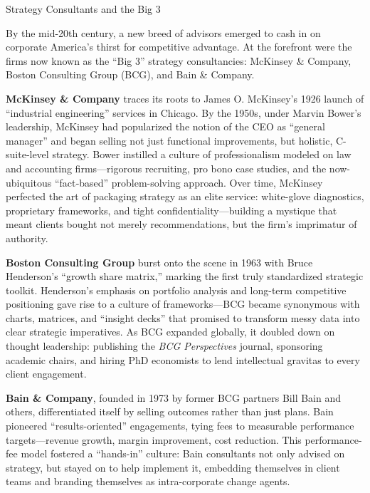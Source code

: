 \begin{HistoricalSidebar}{Strategy Consultants and the Big 3}

  By the mid-20th century, a new breed of advisors emerged to cash in on corporate America’s thirst for competitive 
  advantage.  At the forefront were the firms now known as the “Big 3” strategy consultancies: McKinsey \& Company, 
  Boston Consulting Group (BCG), and Bain \& Company.  

  \medskip
  
  \textbf{McKinsey \& Company} traces its roots to James O. McKinsey’s 1926 launch of “industrial engineering” services 
  in Chicago.  By the 1950s, under Marvin Bower’s leadership, McKinsey had popularized the notion of the CEO as 
  “general manager” and began selling not just functional improvements, but holistic, C-suite‐level strategy.  
  Bower instilled a culture of professionalism modeled on law and accounting firms—rigorous recruiting, 
  pro bono case studies, and the now-ubiquitous “fact‐based” problem-solving approach.  Over time, McKinsey 
  perfected the art of packaging strategy as an elite service: white-glove diagnostics, proprietary frameworks, 
  and tight confidentiality—building a mystique that meant clients bought not merely recommendations, but the 
  firm’s imprimatur of authority.

  \medskip
  
  \textbf{Boston Consulting Group} burst onto the scene in 1963 with Bruce Henderson’s “growth share matrix,” marking 
  the first truly standardized strategic toolkit.  Henderson’s emphasis on portfolio analysis and long-term competitive 
  positioning gave rise to a culture of frameworks—BCG became synonymous with charts, matrices, and “insight decks” 
  that promised to transform messy data into clear strategic imperatives.  As BCG expanded globally, it doubled down 
  on thought leadership: publishing the \emph{BCG Perspectives} journal, sponsoring academic chairs, and hiring 
  PhD economists to lend intellectual gravitas to every client engagement.

  \medskip
  
  \textbf{Bain \& Company}, founded in 1973 by former BCG partners Bill Bain and others, differentiated itself by selling 
  outcomes rather than just plans.  Bain pioneered “results-oriented” engagements, tying fees to measurable performance 
  targets—revenue growth, margin improvement, cost reduction.  This performance-fee model fostered a “hands-in” culture: 
  Bain consultants not only advised on strategy, but stayed on to help implement it, embedding themselves in client 
  teams and branding themselves as intra-corporate change agents.


\end{HistoricalSidebar}
